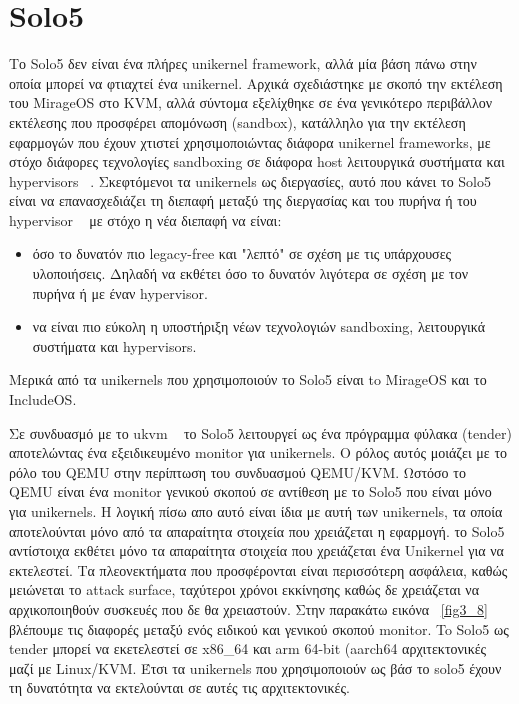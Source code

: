\section{Solo5}

Το Solo5 δεν είναι ένα πλήρες unikernel framework, αλλά μία βάση πάνω στην οποία
μπορεί να φτιαχτεί ένα unikernel. Αρχικά σχεδιάστηκε με σκοπό την εκτέλεση του
MirageOS στο KVM, αλλά σύντομα εξελίχθηκε σε ένα γενικότερο περιβάλλον εκτέλεσης
που προσφέρει απομόνωση (sandbox), κατάλληλο για την εκτέλεση εφαρμογών που
έχουν χτιστεί χρησιμοποιώντας διάφορα unikernel frameworks, με στόχο διάφορες
τεχνολογίες sandboxing σε διάφορα host λειτουργικά συστήματα και hypervisors
~\cite{solo5_repo}. Σκεφτόμενοι τα unikernels ως διεργασίες, αυτό που κάνει το
Solo5 είναι να επανασχεδιάζει τη διεπαφή μεταξύ της διεργασίας και του πυρήνα ή
του hypervisor ~\cite{solo5_technical} με στόχο η νέα διεπαφή να είναι: 
\begin{itemize}
	\item όσο το δυνατόν πιο legacy-free και "λεπτό" σε σχέση με τις
		υπάρχουσες υλοποιήσεις. Δηλαδή να εκθέτει όσο το δυνατόν
		λιγότερα σε σχέση με τον πυρήνα ή με έναν hypervisor.
	\item να είναι πιο εύκολη η υποστήριξη νέων τεχνολογιών sandboxing,
		λειτουργικά συστήματα και hypervisors. 
\end{itemize}
Μερικά από τα unikernels που χρησιμοποιούν το Solo5 είναι to
MirageOS και το IncludeOS. 

Σε συνδυασμό με το ukvm ~\cite{williams2016unikernel} το Solo5 λειτουργεί ως ένα
πρόγραμμα φύλακα (tender) αποτελώντας ένα εξειδικευμένο monitor για unikernels.
Ο ρόλος αυτός μοιάζει με το ρόλο του QEMU στην περίπτωση του συνδυασμού
QEMU/KVM. Ωστόσο το QEMU είναι ένα monitor γενικού σκοπού σε αντίθεση με το
Solo5 που είναι μόνο για unikernels. Η λογική πίσω απο αυτό είναι ίδια με αυτή
των unikernels, τα οποία αποτελούνται μόνο από τα απαραίτητα στοιχεία που
χρειάζεται η εφαρμογή. το Solo5 αντίστοιχα εκθέτει μόνο τα απαραίτητα στοιχεία
που χρειάζεται ένα Unikernel για να εκτελεστεί. Τα πλεονεκτήματα που
προσφέρονται είναι περισσότερη ασφάλεια, καθώς μειώνεται το attack surface,
ταχύτεροι χρόνοι εκκίνησης καθώς δε χρειάζεται να αρχικοποιηθούν συσκευές που δε
θα χρειαστούν. Στην παρακάτω εικόνα ~\ref{fig3_8} βλέπουμε τις διαφορές μεταξύ
ενός ειδικού και γενικού σκοπού monitor. To Solo5 ως tender μπορεί να
εκετελεστεί σε x86\_64 και arm 64-bit (aarch64 αρχιτεκτονικές μαζί με Linux/KVM.
Έτσι τα unikernels που χρησιμοποιούν ως βάσ το solo5 έχουν τη δυνατότητα να
εκτελούνται σε αυτές τις αρχιτεκτονικές.

